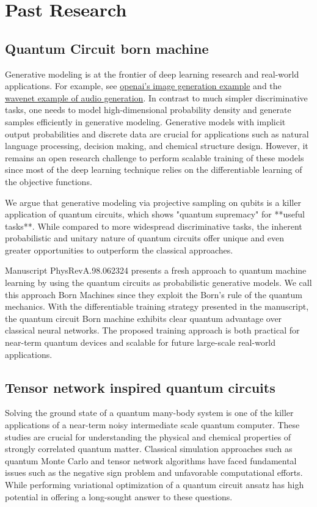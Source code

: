 \documentclass[]{article}
\begin{document}
\section{Past Research}
\subsection{Quantum Circuit born machine}
Generative modeling is at the frontier of deep learning research and real-world applications. For example, see \href{https://blog.openai.com/generative-models/}{openai's image generation example} and the \href{https://deepmind.com/blog/wavenet-generative-model-raw-audio/}{wavenet example of audio generation}. In contrast to much simpler discriminative tasks, one needs to model high-dimensional probability density and generate samples efficiently in generative modeling. Generative models with implicit output probabilities and discrete data are crucial for applications such as natural language processing, decision making, and chemical structure design. However, it remains an open research challenge to perform scalable training of these models since most of the deep learning technique relies on the differentiable learning of the objective functions. 

We argue that generative modeling via projective sampling on qubits is a killer application of quantum circuits, which shows "quantum supremacy" for **useful tasks**. While compared to more widespread discriminative tasks, the inherent probabilistic and unitary nature of quantum circuits offer unique and even greater opportunities to outperform the classical approaches. 

Manuscript PhysRevA.98.062324 presents a fresh approach to quantum machine learning by using the quantum circuits as probabilistic generative models. We call this approach Born Machines since they exploit the Born's rule of the quantum mechanics.
With the differentiable training strategy presented in the manuscript, the quantum circuit Born machine exhibits clear quantum advantage over classical neural networks. The proposed training approach is both practical for near-term quantum devices and scalable for future large-scale real-world applications. 

\subsection{Tensor network inspired quantum circuits}
Solving the ground state of a quantum many-body system is one of the killer applications of a  near-term noisy intermediate scale quantum computer. These studies are crucial for understanding the physical and chemical properties of strongly correlated quantum matter. Classical simulation approaches such as quantum Monte Carlo and tensor network algorithms have faced fundamental issues such as the negative sign problem and unfavorable computational efforts. While performing variational optimization of a quantum circuit ansatz has high potential in offering a long-sought answer to these questions.   
\end{document}
